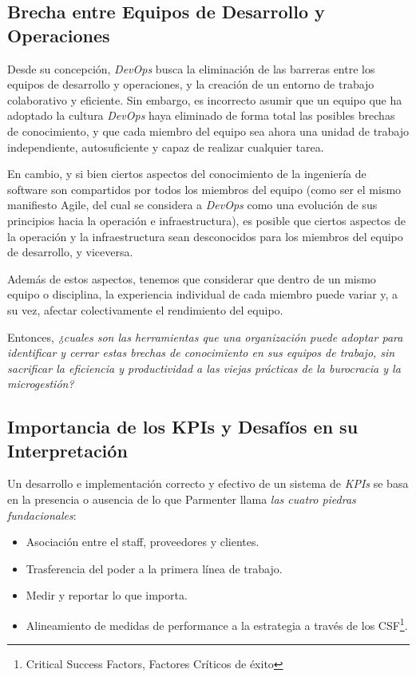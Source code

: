 \documentclass[journal]{IEEEtran}
\begin{document}
\subsection{\textbf{Brecha entre Equipos de Desarrollo y Operaciones}}

Desde su concepción, \textit{DevOps} busca la eliminación de las barreras entre los equipos de desarrollo y operaciones, y la creación de un entorno de trabajo colaborativo y eficiente. 
Sin embargo, es incorrecto asumir que un equipo que ha adoptado la cultura \textit{DevOps} haya eliminado de forma total las posibles brechas de conocimiento, y que cada miembro del equipo sea ahora una unidad de trabajo independiente, autosuficiente y capaz de realizar cualquier tarea. 

En cambio, y si bien ciertos aspectos del conocimiento de la ingeniería de software son compartidos por todos los miembros del equipo (como ser el mismo manifiesto Agile\cite{amaro2024devops}, del cual se considera a \textit{DevOps} como una evolución de sus principios hacia la operación e infraestructura\cite[Part I. The Three Ways]{kim2021devops}), es posible que ciertos aspectos de la operación y la infraestructura sean desconocidos para los miembros del equipo de desarrollo, y viceversa.

Además de estos aspectos, tenemos que considerar que dentro de un mismo equipo o disciplina, la experiencia individual de cada miembro puede variar y, a su vez, afectar colectivamente el rendimiento del equipo.

Entonces, \textit{¿cuales son las herramientas que una organización puede adoptar para identificar y cerrar estas brechas de conocimiento en sus equipos de trabajo, sin sacrificar la eficiencia y productividad a las viejas prácticas de la burocracia y la microgestión?}

\subsection{\textbf{Importancia de los KPIs y Desafíos en su Interpretación}}

Un desarrollo e implementación correcto y efectivo de un sistema de \textit{KPIs} se basa en la presencia o ausencia de lo que Parmenter llama \textit{las cuatro piedras fundacionales}\cite[Chapter 2. Foundation Stones for Implementing Key Performance Indicators]{parmenter2015key}:
\begin{itemize}
    \item Asociación entre el staff, proveedores y clientes.
    \item Trasferencia del poder a la primera línea de trabajo.
    \item Medir y reportar lo que importa.
    \item Alineamiento de medidas de performance a la estrategia a través de los CSF\footnote{Critical Success Factors, Factores Críticos de éxito}.
\end{itemize}
\end{document}
